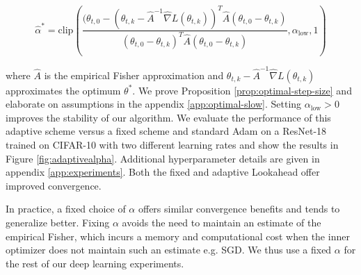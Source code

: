 
\[ \hat{\alpha}^* = \text{clip}( \frac{(\theta_{t,0} - (\theta_{t,k}  - \hat{A}^{-1} \hat{\nabla} L(\theta_{t,k}) )^T \hat{A} (\theta_{t,0}  - \theta_{t,k})}{(\theta_{t,0}  - \theta_{t,k})^T \hat{A} (\theta_{t,0} - \theta_{t,k})},  \alpha_{\text{low}}, 1)\]



 where $\hat{A}$ is the empirical Fisher approximation and $\theta_{t,k}  - \hat{A}^{-1} \hat{\nabla} L(\theta_{t,k})$ approximates the optimum $\theta^*$. We prove Proposition \ref{prop:optimal-step-size} and elaborate on assumptions in the appendix \ref{app:optimal-slow}. Setting $\alpha_{\text{low}} > 0$ improves the stability of our algorithm. We evaluate the performance of this adaptive scheme versus a fixed scheme and standard Adam on a ResNet-18 trained on CIFAR-10 with two different learning rates and show the results in Figure \ref{fig:adaptivealpha}. Additional hyperparameter details are given in appendix \ref{app:experiments}. Both the fixed and adaptive Lookahead offer improved convergence.

In practice, a fixed choice of $\alpha$ offers similar convergence benefits and tends to generalize better. Fixing $\alpha$ avoids the need to maintain an estimate of the empirical Fisher, which incurs a memory and computational cost when the inner optimizer does not maintain such an estimate e.g. SGD. We thus use a fixed $\alpha$ for the rest of our deep learning experiments. %